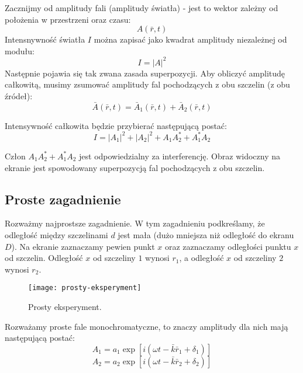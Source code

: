 Zacznijmy od amplitudy fali (amplitudy światła) - jest to wektor zależny od położenia w przestrzeni oraz czasu:
\begin{equation*}
    A(\bar{r}, t)
\end{equation*}
Intensnywność światła $I$ można zapisać jako kwadrat amplitudy niezależnej od modułu:
\begin{equation*}
    I = |A|^2
\end{equation*}
Następnie pojawia się tak zwana zasada superpozycji. Aby obliczyć amplitudę całkowitą, musimy zsumować amplitudy fal pochodzących z obu szczelin (z obu źródeł):
\begin{equation*}
    \bar{A}(\bar{r}, t) = \bar{A}_1(\bar{r}, t) + \bar{A}_2(\bar{r}, t)
\end{equation*}

Intensywność całkowita będzie przybierać następującą postać:
\begin{equation*}
    I = |A_1|^2 + |A_2|^2 + A_1 A_2^* + A_1^* A_2
\end{equation*}

Człon $A_1 A_2^* + A_1^* A_2$ jest odpowiedzialny za interferencję. Obraz widoczny na ekranie jest spowodowany superpozycją fal pochodzących z obu szczelin.

\subsection{Proste zagadnienie}

Rozważmy najprostsze zagadnienie. W tym zagadnieniu podkreślamy, że odległość między szczelinami $d$ jest mała (dużo mniejsza niż odległość do ekranu $D$).
Na ekranie zaznaczamy pewien punkt $x$ oraz zaznaczamy odległości punktu $x$ od szczelin. Odległość $x$ od szczeliny $1$ wynosi $r_1$, a odległość $x$
od szczeliny $2$ wynosi $r_2$.

\begin{figure}[H]
    \centering
    \texttt{[image: prosty-eksperyment]}
    \caption{Prosty eksperyment.}
    \label{fig:prosty-eksperyment}
\end{figure}

Rozważamy proste fale monochromatyczne, to znaczy amplitudy dla nich mają następującą postać:
\begin{equation*}
    A_1 = a_1 \exp[i(\omega t - \bar{k} \bar{r}_1 + \delta_1)]
\end{equation*}
\begin{equation*}
    A_2 = a_2 \exp[i(\omega t - \bar{k} \bar{r}_2 + \delta_2)]
\end{equation*}


